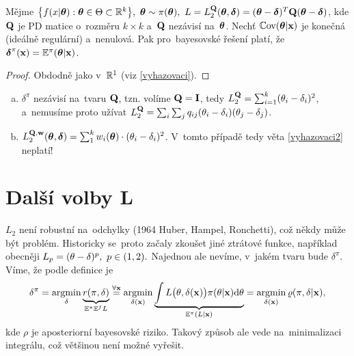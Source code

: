 \begin{theorem}[Vyhazovací 2]\label{vyhazovaci2}
	Mějme $\big\{ f(x|\boldsymbol{\theta}):\boldsymbol{\theta}\in\Theta\subset\mathbb{R}^k \big\},~\boldsymbol{\theta}\sim\pi(\boldsymbol{\theta}),~L=L_2^{\textbf{Q}}(\boldsymbol{\theta},\boldsymbol{\delta})=(\boldsymbol{\theta}-\boldsymbol{\delta})^T\textbf{Q}(\boldsymbol{\theta}-\boldsymbol{\delta})$, kde $\textbf{Q}$ je PD matice o~rozměru $k\times k$ a~$\textbf{Q}$ nezávisí na~$\boldsymbol{\theta}$. Nechť $\mathbb{C}\mathrm{ov}(\boldsymbol{\theta}|\textbf{x})$ je konečná (ideálně regulární) a~nenulová. Pak pro~bayesovské řešení platí, že  $\boldsymbol{\delta}^\pi(\textbf{x})=\mathbb{E}^\pi(\boldsymbol{\theta}|\textbf{x})$. 
	\begin{proof}
		Obdodně jako v~$\mathbb{R}^1$ (viz \ref{vyhazovaci}).
	\end{proof}
\end{theorem}
\begin{remark}
	\begin{enumerate}[a)]
		\item $\delta^\pi$ nezávisí na~tvaru $\textbf{Q}$, tzn. volíme $\textbf{Q}=\textbf{I}$, tedy $L_2^{\textbf{Q}}=\sum_{i=1}^k (\theta_i-\delta_i)^2$, a~nemusíme proto užívat $L_2^{\textbf{Q}}=\sum_i\sum_j q_{ij}(\theta_i-\delta_i)(\theta_j-\delta_j)$.
		\item $L_2^{\textbf{Q},\textbf{w}}(\boldsymbol{\theta},\boldsymbol{\delta})=\sum_1^k w_i(\boldsymbol{\theta})\cdot(\theta_i-\delta_i)^2$. V~tomto případě tedy věta \ref{vyhazovaci2} neplatí! 
	\end{enumerate}
\end{remark}

\section{Další volby L}
$L_2$ není robustní na~odchylky (1964 Huber, Hampel, Ronchetti), což někdy může být problém. Historicky se~proto začaly zkoušet jiné ztrátové funkce, například obecněji $L_p=(\theta-\delta)^p,~p\in(1,2).$ Najednou ale nevíme, v~jakém tvaru bude $\delta^\pi$. Víme, že podle definice je 
$$\delta^\pi=\mathop{\mathrm{argmin}}_\delta \underbrace{r(\pi,\delta)}_{\mathbb{E}^\pi \mathbb{E}^f L}\stackrel{\forall\textbf{x}}{=}
\mathop{\mathrm{argmin}}_{\delta(\textbf{x})}
\underbrace{\int L\big(\theta,\delta(\textbf{x})\big)\pi(\theta|\textbf{x})\mathrm{d}\theta}_{\mathbb{E}^\pi(L|\textbf{x})}= \mathop{\mathrm{argmin}}_{\delta(\textbf{x})}\varrho(\pi,\delta|\textbf{x}) 
,$$ kde $\rho$ je aposteriorní bayesovské riziko. Takový způsob ale vede na~minimalizaci integrálu, což většinou není možné vyřešit.


